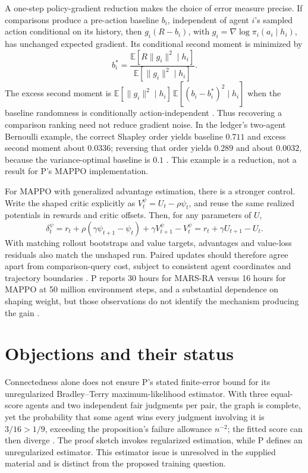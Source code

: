\documentclass{article}
\begin{document}
A one-step policy-gradient reduction makes the choice of error measure precise. If comparisons produce a pre-action baseline \(b_i\), independent of agent \(i\)'s sampled action conditional on its history, then \(g_i(R-b_i)\), with \(g_i=\nabla\log\pi_i(a_i\mid h_i)\), has unchanged expected gradient. Its conditional second moment is minimized by
\[
b_i^*
=
\frac{\mathbb{E}[R\lVert g_i\rVert^2\mid h_i]}
     {\mathbb{E}[\lVert g_i\rVert^2\mid h_i]}.
\]
The excess second moment is
\(\mathbb{E}[\lVert g_i\rVert^2\mid h_i]\,
\mathbb{E}[(b_i-b_i^*)^2\mid h_i]\) when the baseline randomness is conditionally action-independent . Thus recovering a comparison ranking need not reduce gradient noise. In the ledger's two-agent Bernoulli example, the correct Shapley order yields baseline \(0.711\) and excess second moment about \(0.0336\); reversing that order yields \(0.289\) and about \(0.0032\), because the variance-optimal baseline is \(0.1\) . This example is a reduction, not a result for P's MAPPO implementation.

For MAPPO with generalized advantage estimation, there is a stronger control. Write the shaped critic explicitly as \(V_t^\psi=U_t-\rho\psi_t\), and reuse the same realized potentials in rewards and critic offsets. Then, for any parameters of \(U\),
\[
\delta_t^\psi
=
r_t+\rho(\gamma\psi_{t+1}-\psi_t)
+\gamma V_{t+1}^\psi-V_t^\psi
=
r_t+\gamma U_{t+1}-U_t.
\]
With matching rollout bootstraps and value targets, advantages and value-loss residuals also match the unshaped run. Paired updates should therefore agree apart from comparison-query cost, subject to consistent agent coordinates and trajectory boundaries . P reports 30 hours for MARS-RA versus 16 hours for MAPPO at 50 million environment steps, and a substantial dependence on shaping weight, but those observations do not identify the mechanism producing the gain .

\section*{Objections and their status}
Connectedness alone does not ensure P's stated finite-error bound for its unregularized Bradley--Terry maximum-likelihood estimator. With three equal-score agents and two independent fair judgments per pair, the graph is complete, yet the probability that some agent wins every judgment involving it is \(3/16>1/9\), exceeding the proposition's failure allowance \(n^{-2}\); the fitted score can then diverge . The proof sketch invokes regularized estimation, while P defines an unregularized estimator. This estimator issue is unresolved in the supplied material and is distinct from the proposed training question.
\end{document}
